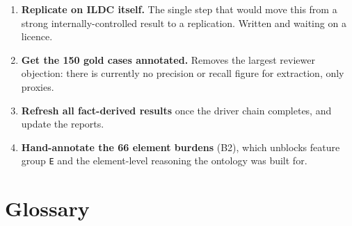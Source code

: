 \documentclass[12pt,a4paper]{article}
\newcommand{\code}[1]{\texttt{\small #1}}
\begin{document}
\begin{enumerate}
\item \textbf{Replicate on ILDC itself.} The single step that would move this from a
strong internally-controlled result to a replication. Written and waiting on a licence.
\item \textbf{Get the 150 gold cases annotated.} Removes the largest reviewer objection: there is
currently no precision or recall figure for extraction, only proxies.
\item \textbf{Refresh all fact-derived results} once the driver chain completes, and update the
reports.
\item \textbf{Hand-annotate the 66 element burdens} (B2), which unblocks feature group \code{E} and
the element-level reasoning the ontology was built for.
\end{enumerate}

\section{Glossary}\label{sec:glossary}
\end{document}

